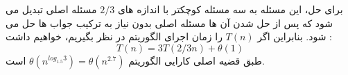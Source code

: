 \documentclass[]{article}
\begin{document}
برای حل، این مسئله به سه مسئله کوچکتر با اندازه های $2/3$ مسئله اصلی تبدیل می شود
که پس از حل شدن آن ها مسئله اصلی بدون نیاز به ترکیب جواب ها حل می شود.
بنابراین اگر $T(n)$ را زمان اجرای الگوریتم در نظر بگیریم، خواهیم داشت :
$$T(n) = 3T(2/3n) + \theta(1)$$
طبق قضیه اصلی کارایی الگوریتم $\theta(n^{log_{1.5}{3}}) = \theta(n^{2.7})$ است.
\end{document}
